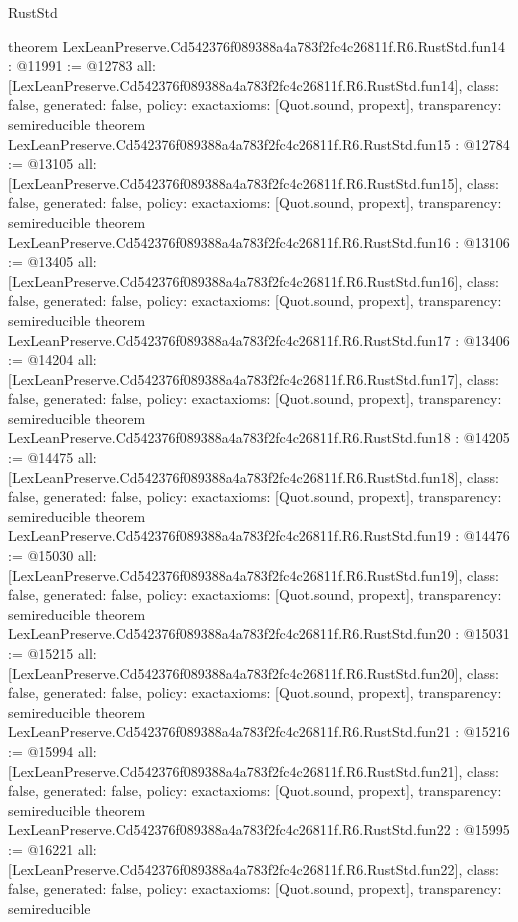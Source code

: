 \begin{lexlean}{RustStd}
\begin{coremodule}
{}
theorem LexLeanPreserve.Cd542376f089388a4a783f2fc4c26811f.R6.RustStd.fun14 : @11991 := @12783 {
  all: [LexLeanPreserve.Cd542376f089388a4a783f2fc4c26811f.R6.RustStd.fun14],
  class: false,
  generated: false,
  policy: exact{axioms: [Quot.sound, propext]},
  transparency: semireducible
}
theorem LexLeanPreserve.Cd542376f089388a4a783f2fc4c26811f.R6.RustStd.fun15 : @12784 := @13105 {
  all: [LexLeanPreserve.Cd542376f089388a4a783f2fc4c26811f.R6.RustStd.fun15],
  class: false,
  generated: false,
  policy: exact{axioms: [Quot.sound, propext]},
  transparency: semireducible
}
theorem LexLeanPreserve.Cd542376f089388a4a783f2fc4c26811f.R6.RustStd.fun16 : @13106 := @13405 {
  all: [LexLeanPreserve.Cd542376f089388a4a783f2fc4c26811f.R6.RustStd.fun16],
  class: false,
  generated: false,
  policy: exact{axioms: [Quot.sound, propext]},
  transparency: semireducible
}
theorem LexLeanPreserve.Cd542376f089388a4a783f2fc4c26811f.R6.RustStd.fun17 : @13406 := @14204 {
  all: [LexLeanPreserve.Cd542376f089388a4a783f2fc4c26811f.R6.RustStd.fun17],
  class: false,
  generated: false,
  policy: exact{axioms: [Quot.sound, propext]},
  transparency: semireducible
}
theorem LexLeanPreserve.Cd542376f089388a4a783f2fc4c26811f.R6.RustStd.fun18 : @14205 := @14475 {
  all: [LexLeanPreserve.Cd542376f089388a4a783f2fc4c26811f.R6.RustStd.fun18],
  class: false,
  generated: false,
  policy: exact{axioms: [Quot.sound, propext]},
  transparency: semireducible
}
theorem LexLeanPreserve.Cd542376f089388a4a783f2fc4c26811f.R6.RustStd.fun19 : @14476 := @15030 {
  all: [LexLeanPreserve.Cd542376f089388a4a783f2fc4c26811f.R6.RustStd.fun19],
  class: false,
  generated: false,
  policy: exact{axioms: [Quot.sound, propext]},
  transparency: semireducible
}
theorem LexLeanPreserve.Cd542376f089388a4a783f2fc4c26811f.R6.RustStd.fun20 : @15031 := @15215 {
  all: [LexLeanPreserve.Cd542376f089388a4a783f2fc4c26811f.R6.RustStd.fun20],
  class: false,
  generated: false,
  policy: exact{axioms: [Quot.sound, propext]},
  transparency: semireducible
}
theorem LexLeanPreserve.Cd542376f089388a4a783f2fc4c26811f.R6.RustStd.fun21 : @15216 := @15994 {
  all: [LexLeanPreserve.Cd542376f089388a4a783f2fc4c26811f.R6.RustStd.fun21],
  class: false,
  generated: false,
  policy: exact{axioms: [Quot.sound, propext]},
  transparency: semireducible
}
theorem LexLeanPreserve.Cd542376f089388a4a783f2fc4c26811f.R6.RustStd.fun22 : @15995 := @16221 {
  all: [LexLeanPreserve.Cd542376f089388a4a783f2fc4c26811f.R6.RustStd.fun22],
  class: false,
  generated: false,
  policy: exact{axioms: [Quot.sound, propext]},
  transparency: semireducible
}
\end{coremodule}
\end{lexlean}
